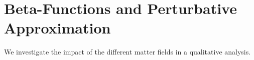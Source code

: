 \section{Beta-Functions and Perturbative Approximation}
We investigate the impact of the different matter fields in a qualitative analysis.  

 

 
 
 